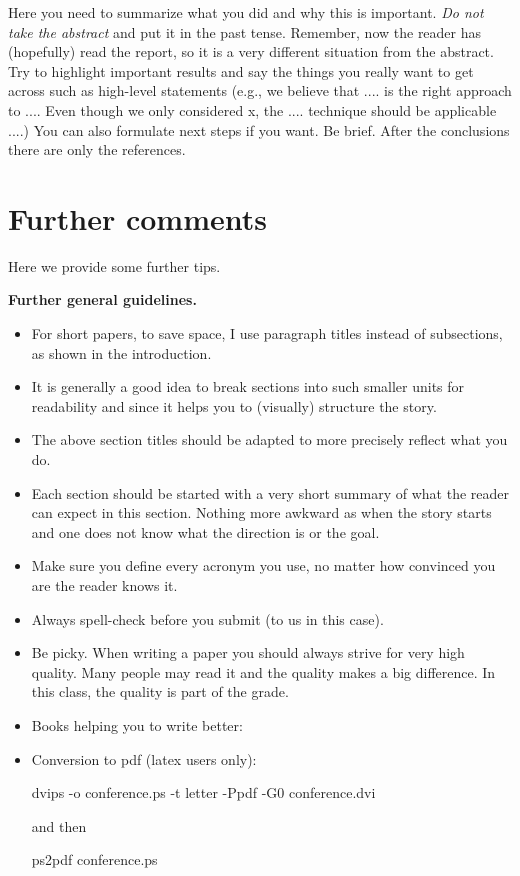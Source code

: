 \documentclass[letterpaper]{article}
\newcommand{\mypar}[1]{{\bf #1.}}
\begin{document}
Here you need to summarize what you did and why this is
important. {\em Do not take the abstract} and put it in the past
tense. Remember, now the reader has (hopefully) read the report, so it
is a very different situation from the abstract. Try to highlight
important results and say the things you really want to get across
such as high-level statements (e.g., we believe that .... is the right
approach to .... Even though we only considered x, the
.... technique should be applicable ....) You can also formulate next
steps if you want. Be brief. After the conclusions there are only the references.

\section{Further comments}

Here we provide some further tips.

\mypar{Further general guidelines}

\begin{itemize}
\item For short papers, to save space, I use paragraph titles instead of
subsections, as shown in the introduction.

\item It is generally a good idea to break sections into such smaller
units for readability and since it helps you to (visually) structure the story.

\item The above section titles should be adapted to more precisely
reflect what you do.

\item Each section should be started with a very
short summary of what the reader can expect in this section. Nothing
more awkward as when the story starts and one does not know what the
direction is or the goal.

\item Make sure you define every acronym you use, no matter how
convinced you are the reader knows it.

\item Always spell-check before you submit (to us in this case).

\item Be picky. When writing a paper you should always strive for very
high quality. Many people may read it and the quality makes a big difference.
In this class, the quality is part of the grade.

\item Books helping you to write better:

\item Conversion to pdf (latex users only): 

dvips -o conference.ps -t letter -Ppdf -G0 conference.dvi

and then

ps2pdf conference.ps
\end{itemize}
\end{document}
